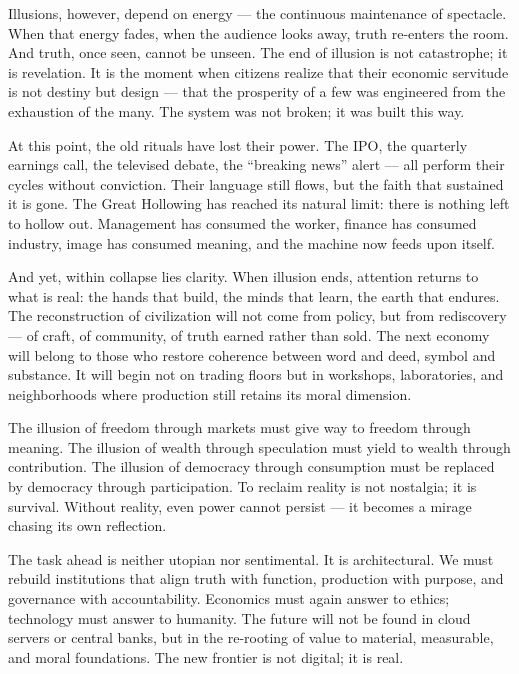 \documentclass[11pt,twoside]{book}
\begin{document}
Illusions, however, depend on energy — the continuous maintenance of spectacle.  When that energy fades, when the audience looks away, truth re-enters the room.  And truth, once seen, cannot be unseen.  The end of illusion is not catastrophe; it is revelation.  It is the moment when citizens realize that their economic servitude is not destiny but design — that the prosperity of a few was engineered from the exhaustion of the many.  The system was not broken; it was built this way.

At this point, the old rituals have lost their power.  The IPO, the quarterly earnings call, the televised debate, the “breaking news” alert — all perform their cycles without conviction.  Their language still flows, but the faith that sustained it is gone.  The Great Hollowing has reached its natural limit: there is nothing left to hollow out.  Management has consumed the worker, finance has consumed industry, image has consumed meaning, and the machine now feeds upon itself.

And yet, within collapse lies clarity.  When illusion ends, attention returns to what is real: the hands that build, the minds that learn, the earth that endures.  The reconstruction of civilization will not come from policy, but from rediscovery — of craft, of community, of truth earned rather than sold.  The next economy will belong to those who restore coherence between word and deed, symbol and substance.  It will begin not on trading floors but in workshops, laboratories, and neighborhoods where production still retains its moral dimension.

The illusion of freedom through markets must give way to freedom through meaning.  The illusion of wealth through speculation must yield to wealth through contribution.  The illusion of democracy through consumption must be replaced by democracy through participation.  To reclaim reality is not nostalgia; it is survival.  Without reality, even power cannot persist — it becomes a mirage chasing its own reflection.

The task ahead is neither utopian nor sentimental.  It is architectural.  We must rebuild institutions that align truth with function, production with purpose, and governance with accountability.  Economics must again answer to ethics; technology must answer to humanity.  The future will not be found in cloud servers or central banks, but in the re-rooting of value to material, measurable, and moral foundations.  The new frontier is not digital; it is real.
\end{document}
